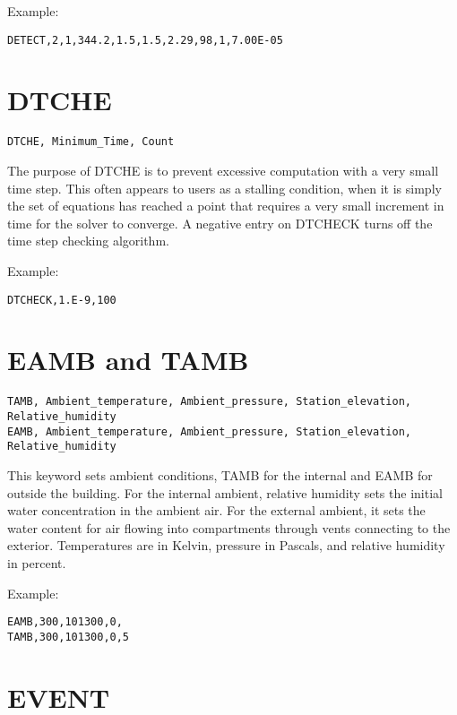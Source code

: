 Example:

\begin{lstlisting}
DETECT,2,1,344.2,1.5,1.5,2.29,98,1,7.00E-05
\end{lstlisting}

\section{DTCHE}

\begin{lstlisting}
DTCHE, Minimum_Time, Count
\end{lstlisting}

The purpose of DTCHE is to prevent excessive computation with a very small time step. This often appears to users as a stalling condition, when it is simply the set of equations has reached a point that requires a very small increment in time for the solver to converge. A negative entry on DTCHECK turns off the time step checking algorithm.

Example:

\begin{lstlisting}
DTCHECK,1.E-9,100
\end{lstlisting}

\section{EAMB and TAMB}

\begin{lstlisting}
TAMB, Ambient_temperature, Ambient_pressure, Station_elevation, Relative_humidity
EAMB, Ambient_temperature, Ambient_pressure, Station_elevation, Relative_humidity
\end{lstlisting}

This keyword sets ambient conditions, TAMB for the internal and EAMB for outside the building. For the internal ambient, relative humidity sets the initial water concentration in the ambient air.  For the external ambient, it sets the water content for air flowing into compartments through vents connecting to the exterior. Temperatures are in Kelvin, pressure in Pascals, and relative humidity in percent.

Example:

\begin{lstlisting}
EAMB,300,101300,0,
TAMB,300,101300,0,5
\end{lstlisting}

\section{EVENT}

